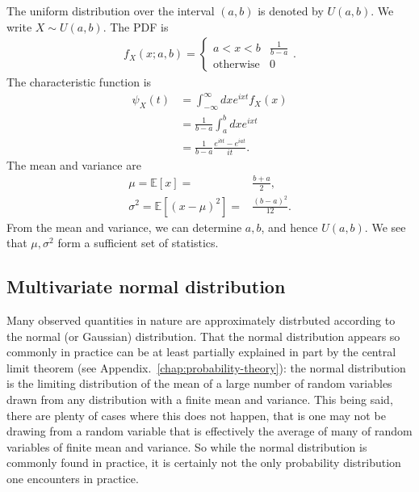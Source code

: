The uniform distribution over the interval $\left(a,b\right)$
is denoted by $U\left(a,b\right)$. We write $X\sim U\left(a,b\right)$.
The PDF is
\begin{align}
    f_X\left(x;a,b\right)
    =
    \begin{cases}
        a<x<b & \frac{1}{b-a}
        \\
        \mathrm{otherwise} & 0
    \end{cases}
    .
\end{align}
The characteristic function is
\begin{align}
    \psi_{X}\left(t\right)
    &=
    \int_{-\infty}^{\infty}dx e^{ix t} f_{X}\left(x\right)
    \nonumber\\
    &=
    \frac{1}{b-a}\int_{a}^{b}dx e^{ix t}
    \nonumber\\
    &=
    \frac{1}{b-a} \frac{e^{ibt} - e^{iat}}{it}
    .
\end{align}
The mean and variance are
\begin{align}
    \mu
    =
    \mathbb{E}\left[x\right]
    =&
    \frac{b+a}{2}
    ,\\
    \sigma^2
    =
    \mathbb{E}\left[\left(x-\mu\right)^2\right]
    =&
    \frac{\left(b-a\right)^2}{12}
    .
\end{align}
From the mean and variance, we can determine $a,b$, and hence $U\left(a,b\right)$.
We see that $\mu,\sigma^2$ form a sufficient set of statistics.
\subsection{Multivariate normal distribution}
Many observed quantities in nature are approximately distrbuted according
to the normal (or Gaussian) distribution.
That the normal distribution appears so commonly in practice can be at least
partially explained in part by the central limit theorem
(see Appendix.~\ref{chap:probability-theory}): the normal distribution is the
limiting distribution
of the mean of a large number of random variables drawn from any distribution
with a finite mean and variance.
This being said, there are plenty of cases where this does not happen, 
that is one may not be drawing from a random variable that is effectively the average of many of random variables of finite mean and variance.
So while the normal distribution is commonly found in practice, it is certainly not the only probability distribution one encounters in practice. 

